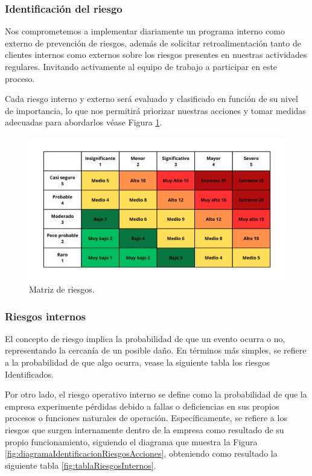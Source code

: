     \subsubsection{Identificación del riesgo}
    
    Nos comprometemos a implementar diariamente un programa interno como externo de prevención de riesgos, además de solicitar retroalimentación tanto de clientes internos como externos sobre los riesgos presentes en nuestras actividades regulares. Invitando activamente al equipo de trabajo a participar en este proceso. 
    
    Cada riesgo interno y externo será evaluado y clasificado en función de su nivel de importancia, lo que nos permitirá priorizar nuestras acciones y tomar medidas adecuadas para abordarlos véase Figura \ref{fig:nivelesDeRiesgos}.
    
     \begin{figure}[H]
        \centering
        \includegraphics[scale=0.17]{15/img/nivelesDeRiesgos.pdf}
        \caption{Matriz de riesgos.}
        \label{fig:nivelesDeRiesgos}
    \end{figure}
    
    \subsubsection{Riesgos internos}
    
    El concepto de riesgo implica la probabilidad de que un evento ocurra o no, representando la cercanía de un posible daño. En términos más simples, se refiere a la probabilidad de que algo ocurra, vease la siguiente tabla los riesgos Identificados.
    
    Por otro lado, el riesgo operativo interno se define como la probabilidad de que la empresa experimente pérdidas debido a fallas o deficiencias en sus propios procesos o funciones naturales de operación. Específicamente, se refiere a los riesgos que surgen internamente dentro de la empresa como resultado de su propio funcionamiento, siguiendo el diagrama que muestra la Figura \ref{fig:diagramaIdentificacionRiesgosAcciones}, obteniendo como resultado la siguiente tabla \ref{fig:tablaRiesgosInternos}.
    
